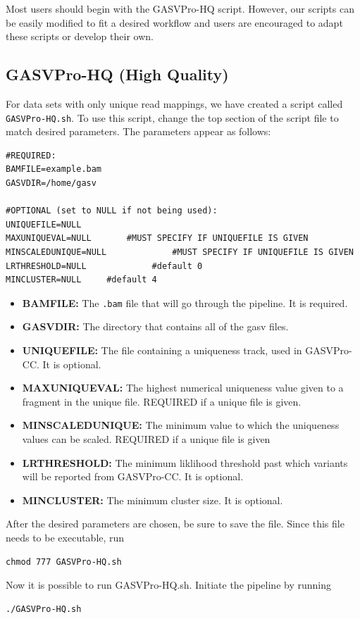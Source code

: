 \documentclass[11pt]{article}
\begin{document}
Most users should begin with the GASVPro-HQ script. However, our scripts can be easily modified to fit a desired workflow and users are encouraged to adapt these scripts or develop their own. 

\subsection{GASVPro-HQ (High Quality)}
For data sets with only unique read mappings, we have created a script called \verb+GASVPro-HQ.sh+. To use this script, change the top section of the script file to match desired parameters. The parameters appear as follows: 
\begin{Verbatim}[frame=single]
#REQUIRED:
BAMFILE=example.bam
GASVDIR=/home/gasv

#OPTIONAL (set to NULL if not being used):
UNIQUEFILE=NULL
MAXUNIQUEVAL=NULL		#MUST SPECIFY IF UNIQUEFILE IS GIVEN
MINSCALEDUNIQUE=NULL             #MUST SPECIFY IF UNIQUEFILE IS GIVEN
LRTHRESHOLD=NULL	         #default 0
MINCLUSTER=NULL	  	#default 4
\end{Verbatim}
\begin{itemize}
\item {\bf BAMFILE:} The \verb+.bam+ file that will go through the pipeline. It is required.
\item {\bf GASVDIR:} The directory that contains all of the gasv files.
\item {\bf UNIQUEFILE:} The file containing a uniqueness track, used in GASVPro-CC. It is optional.
\item {\bf MAXUNIQUEVAL:} The highest numerical uniqueness value given to a fragment in the unique file. REQUIRED if a unique file is given.
\item {\bf MINSCALEDUNIQUE:} The minimum value to which the uniqueness values can be scaled. REQUIRED if a unique file is given
\item {\bf LRTHRESHOLD:} The minimum liklihood threshold past which variants will be reported from GASVPro-CC. It is optional.
\item {\bf MINCLUSTER: } The minimum cluster size. It is optional.
\end{itemize}

\noindent After the desired parameters are chosen, be sure to save the file. Since this file needs to be executable, run 
\begin{Verbatim}[frame=single]
chmod 777 GASVPro-HQ.sh
\end{Verbatim}
Now it is possible to run GASVPro-HQ.sh. Initiate the pipeline by running 
\begin{Verbatim}[frame=single]
./GASVPro-HQ.sh
\end{Verbatim}
\end{document}

